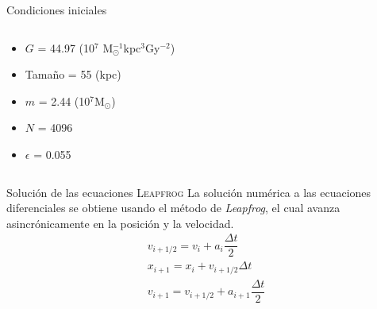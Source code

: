 \documentclass{beamer}
\begin{document}
\begin{frame}{Condiciones iniciales}
\begin{columns}
\begin{column}{0.5\textwidth}
			\footnotesize
			\begin{itemize}
				\item $G$ = 44.97 (10$^7$ M$_{\odot}^{-1}$kpc$^3$Gy$^{-2}$)
				\item Tama\~no = 55 (kpc)
				\item $m$ = 2.44 (10$^7$M$_{\odot}$)
				\item $N$ = 4096
				\item $\epsilon$ = 0.055
			\end{itemize}
		\end{column}
	\end{columns}
\end{frame}
\begin{frame}{Soluci\'on de las ecuaciones}
	{\scshape Leapfrog}
	La soluci\'on num\'erica a las ecuaciones diferenciales se obtiene usando el m\'etodo de \textit{Leapfrog}, el cual avanza asincr\'onicamente en la posici\'on y la velocidad.
	\begin{equation}
		\begin{matrix}
			v_{i+1/2} = v_i + a_i\dfrac{\Delta t}{2}\\
			x_{i+1} = x_i + v_{i+1/2}\Delta t \\
			v_{i+1} = v_{i+1/2}+a_{i+1}\dfrac{\Delta t}{2}
		\end{matrix}
	\end{equation}
\end{frame}
\end{document}
